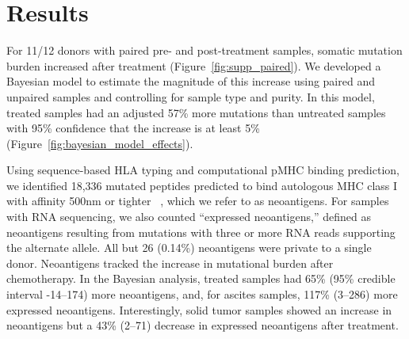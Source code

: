 \section*{Results}


For 11/12 donors with paired pre- and post-treatment samples, somatic mutation burden increased after treatment (Figure~\ref{fig:supp_paired}). We developed a Bayesian model to estimate the magnitude of this increase using paired and unpaired samples and controlling for sample type and purity. In this model, treated samples had an adjusted 57\% more mutations than untreated samples with 95\% confidence that the increase is at least 5\% (Figure~\ref{fig:bayesian_model_effects}).






Using sequence-based HLA typing and computational pMHC binding prediction, we identified 18,336 mutated peptides predicted to bind autologous MHC class I with affinity 500nm or tighter ~\cite{Sette1994}, which we refer to as neoantigens. For samples with RNA sequencing, we also counted ``expressed neoantigens,'' defined as neoantigens resulting from mutations with three or more RNA reads supporting the alternate allele. All but 26 (0.14\%) neoantigens were private to a single donor. Neoantigens tracked the increase in mutational burden after chemotherapy. In the Bayesian analysis, treated samples had 65\% (95\% credible interval -14--174) more neoantigens, and, for ascites samples, 117\% (3--286) more expressed neoantigens. Interestingly, solid tumor samples showed an increase in neoantigens but a 43\% (2--71) decrease in expressed neoantigens after treatment.

